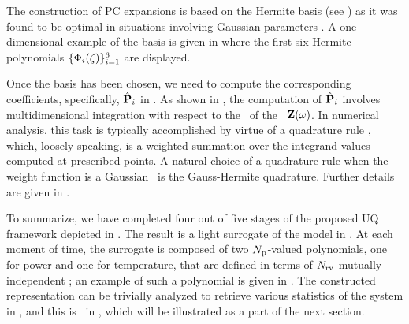 The construction of PC expansions is based on the Hermite basis (see ) as it was found to be optimal in situations involving Gaussian parameters \cite{xiu2010}. A one-dimensional example of the basis is given in  where the first six Hermite polynomials $\{ \Phi_i(\zeta) \}_{i = 1}^6$ are displayed.

Once the basis has been chosen, we need to compute the corresponding coefficients, specifically, $\hat{\mathbf{P}}_i$ in . As shown in , the computation of $\hat{\mathbf{P}}_i$ involves multidimensional integration with respect to the \pdf\ of the \rvs\ $\mathbf{Z}(\omega)$. In numerical analysis, this task is typically accomplished by virtue of a quadrature rule \cite{press2007}, which, loosely speaking, is a weighted summation over the integrand values computed at prescribed points. A natural choice of a quadrature rule when the weight function is a Gaussian \pdf\ is the Gauss-Hermite quadrature. Further details are given in .

To summarize, we have completed four out of five stages of the proposed UQ framework depicted in . The result is a light surrogate of the model in . At each moment of time, the surrogate is composed of two ${N_\text{p}}$-valued polynomials, one for power and one for temperature, that are defined in terms of ${N_\text{rv}}$ mutually independent \rvs; an example of such a polynomial is given in . The constructed representation can be trivially analyzed to retrieve various statistics of the system in , and this is \ in , which will be illustrated as a part of the next section.
